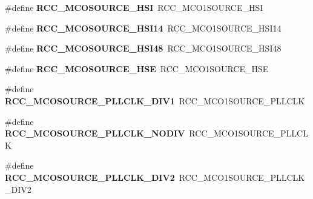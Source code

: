 \begin{DoxyCompactItemize}
\item 
\#define {\bfseries R\+C\+C\+\_\+\+M\+C\+O\+S\+O\+U\+R\+C\+E\+\_\+\+H\+SI}~R\+C\+C\+\_\+\+M\+C\+O1\+S\+O\+U\+R\+C\+E\+\_\+\+H\+SI\hypertarget{group___h_a_l___r_c_c___aliased_gaf76c21fc91d02a5006b1ad20bb09fb59}{}\label{group___h_a_l___r_c_c___aliased_gaf76c21fc91d02a5006b1ad20bb09fb59}

\item 
\#define {\bfseries R\+C\+C\+\_\+\+M\+C\+O\+S\+O\+U\+R\+C\+E\+\_\+\+H\+S\+I14}~R\+C\+C\+\_\+\+M\+C\+O1\+S\+O\+U\+R\+C\+E\+\_\+\+H\+S\+I14\hypertarget{group___h_a_l___r_c_c___aliased_gaf44dc4cc77e850c96fc1fee93a74a838}{}\label{group___h_a_l___r_c_c___aliased_gaf44dc4cc77e850c96fc1fee93a74a838}

\item 
\#define {\bfseries R\+C\+C\+\_\+\+M\+C\+O\+S\+O\+U\+R\+C\+E\+\_\+\+H\+S\+I48}~R\+C\+C\+\_\+\+M\+C\+O1\+S\+O\+U\+R\+C\+E\+\_\+\+H\+S\+I48\hypertarget{group___h_a_l___r_c_c___aliased_ga31f756beeaf0bcc8082ec46ff42cfb2c}{}\label{group___h_a_l___r_c_c___aliased_ga31f756beeaf0bcc8082ec46ff42cfb2c}

\item 
\#define {\bfseries R\+C\+C\+\_\+\+M\+C\+O\+S\+O\+U\+R\+C\+E\+\_\+\+H\+SE}~R\+C\+C\+\_\+\+M\+C\+O1\+S\+O\+U\+R\+C\+E\+\_\+\+H\+SE\hypertarget{group___h_a_l___r_c_c___aliased_ga4e6a5a2c5b38b11470c34f9adc4adb5a}{}\label{group___h_a_l___r_c_c___aliased_ga4e6a5a2c5b38b11470c34f9adc4adb5a}

\item 
\#define {\bfseries R\+C\+C\+\_\+\+M\+C\+O\+S\+O\+U\+R\+C\+E\+\_\+\+P\+L\+L\+C\+L\+K\+\_\+\+D\+I\+V1}~R\+C\+C\+\_\+\+M\+C\+O1\+S\+O\+U\+R\+C\+E\+\_\+\+P\+L\+L\+C\+LK\hypertarget{group___h_a_l___r_c_c___aliased_ga962bbca249325c15747b0b49c47a378c}{}\label{group___h_a_l___r_c_c___aliased_ga962bbca249325c15747b0b49c47a378c}

\item 
\#define {\bfseries R\+C\+C\+\_\+\+M\+C\+O\+S\+O\+U\+R\+C\+E\+\_\+\+P\+L\+L\+C\+L\+K\+\_\+\+N\+O\+D\+IV}~R\+C\+C\+\_\+\+M\+C\+O1\+S\+O\+U\+R\+C\+E\+\_\+\+P\+L\+L\+C\+LK\hypertarget{group___h_a_l___r_c_c___aliased_ga8f2e0c2303a5c5c53a64a60f6900b09e}{}\label{group___h_a_l___r_c_c___aliased_ga8f2e0c2303a5c5c53a64a60f6900b09e}

\item 
\#define {\bfseries R\+C\+C\+\_\+\+M\+C\+O\+S\+O\+U\+R\+C\+E\+\_\+\+P\+L\+L\+C\+L\+K\+\_\+\+D\+I\+V2}~R\+C\+C\+\_\+\+M\+C\+O1\+S\+O\+U\+R\+C\+E\+\_\+\+P\+L\+L\+C\+L\+K\+\_\+\+D\+I\+V2\hypertarget{group___h_a_l___r_c_c___aliased_ga0c689edb9d017b7498258d5e9a9cf5f6}{}\label{group___h_a_l___r_c_c___aliased_ga0c689edb9d017b7498258d5e9a9cf5f6}


\end{DoxyCompactItemize}
